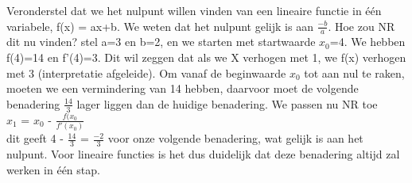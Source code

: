 Veronderstel dat we het nulpunt willen vinden van een lineaire functie in \'e\'en variabele, f(x) = ax+b. We weten dat het nulpunt gelijk is aan $\frac{-b}{a}$. Hoe zou NR dit nu vinden? stel a=3 en b=2, en we starten met startwaarde $x_0$=4. We hebben f(4)=14 en  f'(4)=3. Dit wil zeggen dat als we X verhogen met 1, we f(x) verhogen met 3 (interpretatie afgeleide). Om vanaf de beginwaarde $x_0$ tot aan nul te raken, moeten we een vermindering van 14 hebben, daarvoor moet de volgende benadering $\frac{14}{3}$ lager liggen dan de huidige benadering. We passen nu NR toe \\
$x_1$ = $x_0$ - $\frac{f(x_0}{f'(x_0)}$ \\ 
dit geeft 4 - $\frac{14}{3}$ = $\frac{-2}{3}$ voor onze volgende benadering, wat gelijk is aan het nulpunt. Voor lineaire functies is het dus duidelijk dat deze benadering altijd zal werken in \'e\'en stap.
